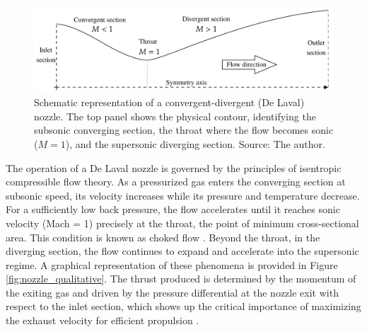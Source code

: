 \documentclass[tg, EN]{ufabcFHZh_tg}
\begin{document}
\begin{figure}[H]
    \centering
    \includegraphics[width=\textwidth]{Figuras/cd_nozzle.pdf} 
    \caption{Schematic representation of a convergent-divergent (De Laval) nozzle. The top panel shows the physical contour, identifying the subsonic converging section, the throat where the flow becomes sonic ($M=1$), and the supersonic diverging section. Source: The author.}
    \label{fig:nozzle_representation}
\end{figure}

The operation of a De Laval nozzle is governed by the principles of isentropic compressible flow theory. As a pressurized gas enters the converging section at subsonic speed, its velocity increases while its pressure and temperature decrease. For a sufficiently low back pressure, the flow accelerates until it reaches sonic velocity (Mach = 1) precisely at the throat, the point of minimum cross-sectional area. This condition is known as choked flow \citep{sutton2010, zucrow1976,white2011}. Beyond the throat, in the diverging section, the flow continues to expand and accelerate into the supersonic regime. A graphical representation of these phenomena is provided in Figure \ref{fig:nozzle_qualitative}. The thrust produced is determined by the momentum of the exiting gas and driven by the pressure differential at the nozzle exit with respect to the inlet section, which shows up the critical importance of maximizing the exhaust velocity for efficient propulsion \citep{anderson2003}.
\end{document}
